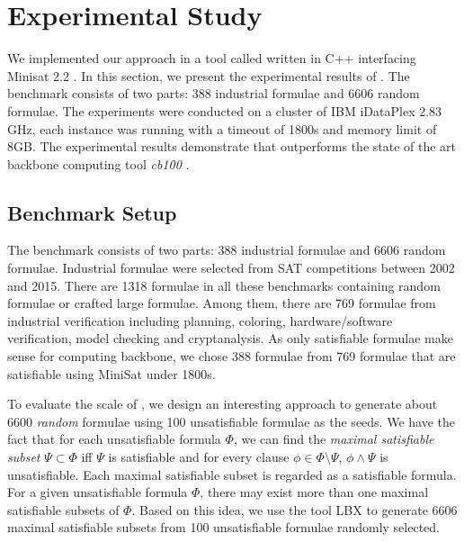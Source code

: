 \section{Experimental Study}\label{sec:expr}
We implemented our approach in a tool called \tool written in C++ interfacing Minisat 2.2 \cite{MINISAT}. %
In this section, we present the experimental results of \tool.
The benchmark consists of two parts: 388 industrial formulae and 6606 random formulae.
The experiments were conducted on a cluster of IBM iDataPlex 2.83 GHz, each instance was running with a timeout of 1800s and memory limit of 8GB.
The experimental results demonstrate that \tool outperforms the state of the art backbone computing tool
\textit{cb100} \cite{JLM15}.

\subsection{Benchmark Setup}
The benchmark consists of two parts: 388 industrial formulae and 6606 random formulae.
Industrial formulae were selected from SAT competitions between 2002 and 2015.
There are 1318 formulae in all these benchmarks containing random formulae or crafted large formulae.
Among them, there are 769 formulae from industrial verification including planning, coloring, hardware/software verification, model checking and cryptanalysis.
As only satisfiable formulae make sense for computing backbone, we chose 388 formulae from 769 formulae that are satisfiable using MiniSat under 1800s.


To evaluate the scale  of \tool, we design an interesting approach to generate about 6600 \textit{random} formulae using 100 unsatisfiable formulae as the seeds. We have the fact that for each unsatisfiable formula $\Phi$, we can find the \textit{maximal satisfiable subset} $\Psi\subset \Phi$
iff $\Psi$ is satisfiable and for every clause $\phi\in\Phi\setminus \Psi$, $\phi\wedge \Psi$ is unsatisfiable.
Each maximal satisfiable subset is regarded as a satisfiable formula.
For a given unsatisfiable formula $\Phi$, there may exist more than one maximal satisfiable subsets of $\Phi$. Based on this idea, we use the tool LBX \cite{MPA2015} to generate 6606 maximal satisfiable subsets from 100 unsatisfiable formulae randomly selected.







